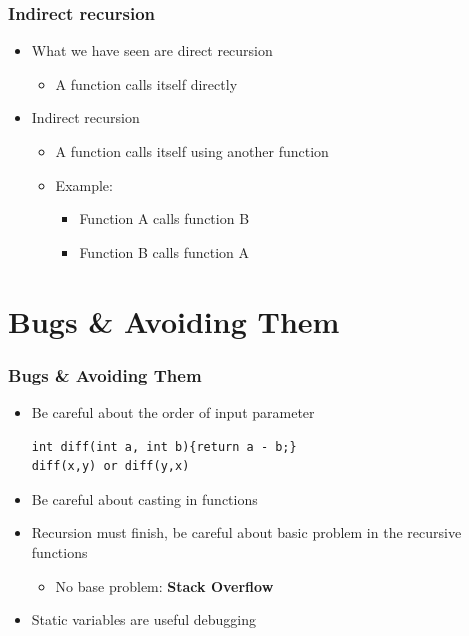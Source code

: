 \documentclass{../c-lecture}
\begin{document}
\begin{frame}
  \frametitle{Indirect recursion}
  \begin{itemize}
    \item What we have seen are direct recursion
    \begin{itemize}
      \item A function calls itself directly
    \end{itemize}
    \item Indirect recursion
    \begin{itemize}
      \item A function calls itself using another function
      \item Example:
      \begin{itemize}
        \item Function A calls function B
        \item Function B calls function A
      \end{itemize}
    \end{itemize}
  \end{itemize}
\end{frame}

\section{Bugs \& Avoiding Them}

\begin{frame}[fragile]
  \frametitle{Bugs \& Avoiding Them}
  \begin{itemize}
    \item Be careful about the order of input parameter
    \begin{verbatim}
int diff(int a, int b){return a - b;}
diff(x,y) or diff(y,x)
    \end{verbatim}
    \item Be careful about casting in functions
    \item
      Recursion must finish, be careful about basic problem in the recursive
      functions
    \begin{itemize}
      \item
        No base problem: \textbf{\color{YellowOrange} Stack Overflow}
    \end{itemize}
    \item Static variables are useful debugging
  \end{itemize}
\end{frame}
\end{document}
